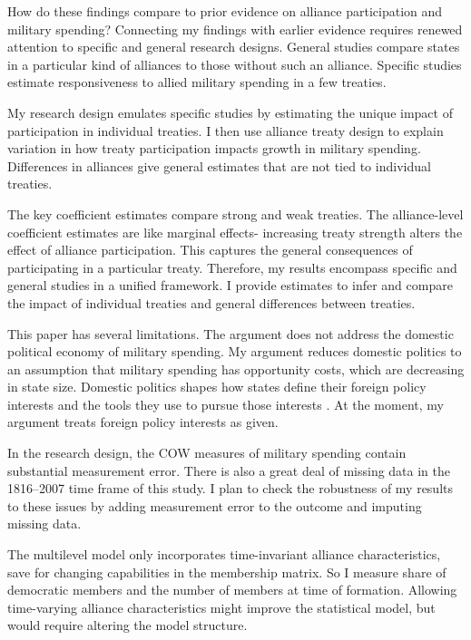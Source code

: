 \documentclass[12pt]{article}
\begin{document}
How do these findings compare to prior evidence on alliance participation and military spending? 
Connecting my findings with earlier evidence requires renewed attention to specific and general research designs. 
General studies compare states in a particular kind of alliances to those without such an alliance. 
Specific studies estimate responsiveness to allied military spending in a few treaties. 


My research design emulates specific studies by estimating the unique impact of participation in individual treaties. 
I then use alliance treaty design to explain variation in how treaty participation impacts growth in military spending.
Differences in alliances give general estimates that are not tied to individual treaties.  


The key coefficient estimates compare strong and weak treaties. 
The alliance-level coefficient estimates are like marginal effects- increasing treaty strength alters the effect of alliance participation.
This captures the general consequences of participating in a particular treaty. 
Therefore, my results encompass specific and general studies in a unified framework. 
I provide estimates to infer and compare the impact of individual treaties and general differences between treaties. 


This paper has several limitations.
The argument does not address the domestic political economy of military spending. 
My argument reduces domestic politics to an assumption that military spending has opportunity costs, which are decreasing in state size. 
Domestic politics shapes how states define their foreign policy interests and the tools they use to pursue those interests \citep{Fordham1998, Fordham2011, Narizny2007}.
At the moment, my argument treats foreign policy interests as given.  


In the research design, the COW measures of military spending contain substantial measurement error. 
There is also a great deal of missing data in the 1816--2007 time frame of this study. 
I plan to check the robustness of my results to these issues by adding measurement error to the outcome and imputing missing data.


The multilevel model only incorporates time-invariant alliance characteristics, save for changing capabilities in the membership matrix. 
So I measure share of democratic members and the number of members at time of formation. 
Allowing time-varying alliance characteristics might improve the statistical model, but would require altering the model structure. 
\end{document}
